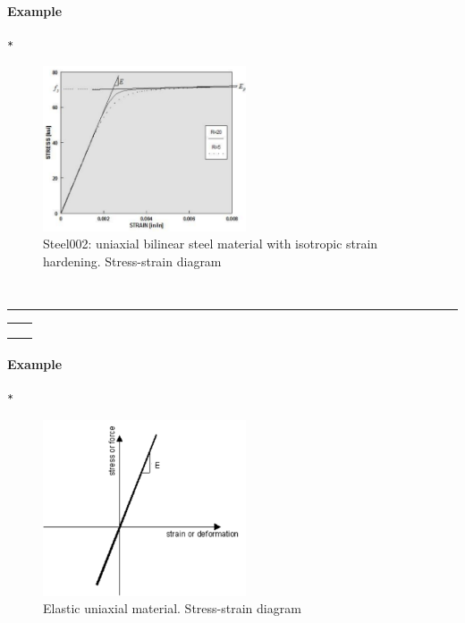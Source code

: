 \paragraph{Example}
\begin{verbatim}
*
\end{verbatim}

\begin{figure}[h]
\centering
\includegraphics[width=60mm]{materials/figures/Steel02Monotonic}
\caption{Steel002: uniaxial bilinear steel material with isotropic strain hardening. Stress-strain diagram}\label{Steel02}
\end{figure}









\subsection{}
\noindent 
\begin{verbatim}

\end{verbatim}
\vspace{-10pt}
{\color{grayLines} \rule{\linewidth}{0.25pt}}
\begin{center}
\begin{tabular}{lp{10cm}}
{\tt } &  \\
{\tt } &  \\
{\tt } &  \\
\end{tabular}
\end{center}
\paragraph{Example}
\begin{verbatim}
*
\end{verbatim}

\begin{figure}[h]
\centering
\includegraphics[width=60mm]{materials/figures/Elastic}
\caption{Elastic uniaxial material. Stress-strain diagram}\label{Elastic}
\end{figure}
